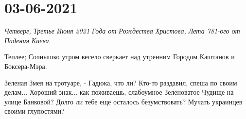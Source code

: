  
 
 
 
 
\section{03-06-2021}

\emph{Четверг, Третье Июня 2021 Года от Рождества Христова, Лета 781-ого от Падения Киева}.

Теплее; Солнышко утром весело сверкает над утренним Городом Каштанов и
Боксера-Мэра.

Зеленая Змея на тротуаре, - Гадюка, что ли? Кто-то раздавил, спеша по своим
делам... Хороший знак... как поживаешь, слабоумное Зеленоватое Чудище на улице
Банковой?  Долго ли тебе еще осталось безумствовать? Мучать украинцев своими
глупостями?
